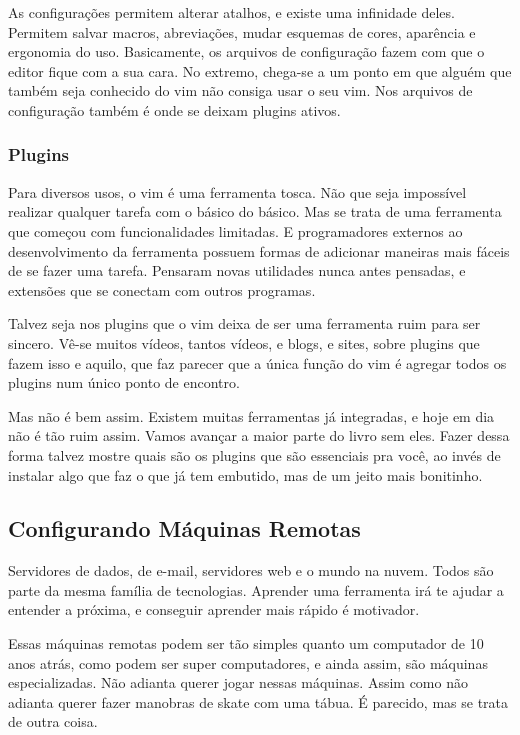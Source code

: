 \documentclass[a4paper, 12pt]{article}
\begin{document}
As configurações permitem alterar atalhos, e existe uma infinidade deles.
Permitem salvar macros, abreviações, mudar esquemas de cores, aparência e ergonomia do uso.
Basicamente, os arquivos de configuração fazem com que o editor fique com a sua cara.
No extremo, chega-se a um ponto em que alguém que também seja conhecido do vim não consiga usar o seu vim.
Nos arquivos de configuração também é onde se deixam plugins ativos.

\subsubsection{Plugins}
Para diversos usos, o vim é uma ferramenta tosca.
Não que seja impossível realizar qualquer tarefa com o básico do básico.
Mas se trata de uma ferramenta que começou com funcionalidades limitadas.
E programadores externos ao desenvolvimento da ferramenta possuem formas de
adicionar maneiras mais fáceis de se fazer uma tarefa.
Pensaram novas utilidades nunca antes pensadas, e extensões que se conectam com outros programas.

Talvez seja nos plugins que o vim deixa de ser uma ferramenta ruim para ser sincero.
Vê-se muitos vídeos, tantos vídeos, e blogs, e sites, sobre plugins que fazem isso e aquilo,
que faz parecer que a única função do vim é agregar todos os plugins num único ponto de encontro.

Mas não é bem assim. Existem muitas ferramentas já integradas, e hoje em dia não é tão ruim assim.
Vamos avançar a maior parte do livro sem eles.
Fazer dessa forma talvez mostre quais são os plugins que são essenciais pra você,
ao invés de instalar algo que faz o que já tem embutido, mas de um jeito mais bonitinho.

\subsection{Configurando Máquinas Remotas}
Servidores de dados, de e-mail, servidores web e o mundo na nuvem.
Todos são parte da mesma família de tecnologias.
Aprender uma ferramenta irá te ajudar a entender a próxima, e conseguir aprender mais rápido é motivador.

Essas máquinas remotas podem ser tão simples quanto um computador de 10 anos atrás, como podem ser super computadores, e ainda assim, são máquinas especializadas.
Não adianta querer jogar nessas máquinas.
Assim como não adianta querer fazer manobras de skate com uma tábua.
É parecido, mas se trata de outra coisa.
\end{document}

